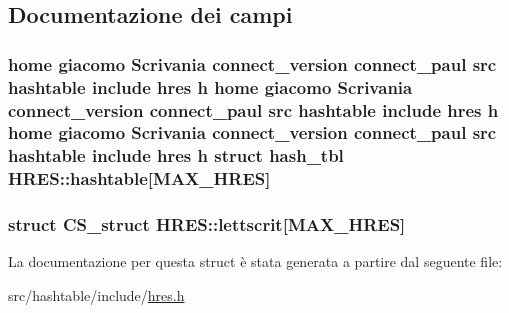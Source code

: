 \subsection{Documentazione dei campi}
\hypertarget{structHRES_a75644267093228e40a1569db3d8dcb99}{
\subsubsection[{hashtable}]{\setlength{\rightskip}{0pt plus 5cm}home giacomo Scrivania connect\_\-version connect\_\-paul src {\bf hashtable} include hres h home giacomo Scrivania connect\_\-version connect\_\-paul src {\bf hashtable} include hres h home giacomo Scrivania connect\_\-version connect\_\-paul src {\bf hashtable} include hres h struct {\bf hash\_\-tbl} {\bf HRES::hashtable}\mbox{[}MAX\_\-HRES\mbox{]}}}
\label{structHRES_a75644267093228e40a1569db3d8dcb99}
\hypertarget{structHRES_a15be68e2c1a18bf0e889c3dc720d85b7}{
\subsubsection[{lettscrit}]{\setlength{\rightskip}{0pt plus 5cm}struct {\bf CS\_\-struct} {\bf HRES::lettscrit}\mbox{[}MAX\_\-HRES\mbox{]}}}
\label{structHRES_a15be68e2c1a18bf0e889c3dc720d85b7}


La documentazione per questa struct è stata generata a partire dal seguente file:\begin{DoxyCompactItemize}
\item 
src/hashtable/include/\hyperlink{hres_8h}{hres.h}\end{DoxyCompactItemize}

